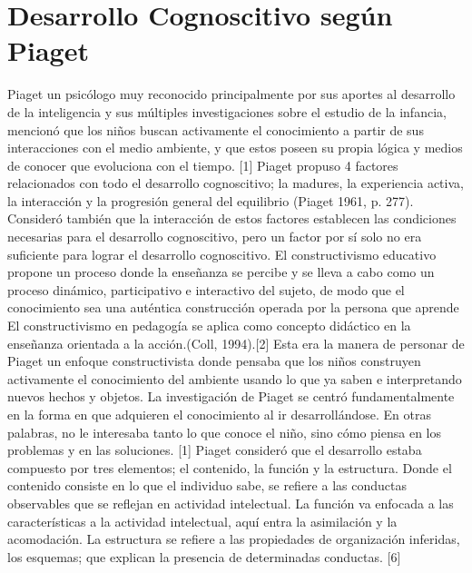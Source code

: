 \documentclass{bmcart}
\begin{document}
\section*{Desarrollo Cognoscitivo según Piaget}
Piaget un psicólogo muy reconocido principalmente por sus aportes al desarrollo de la inteligencia y sus múltiples investigaciones sobre el estudio de la infancia, mencionó que los niños buscan activamente el conocimiento a partir de sus interacciones con el medio ambiente,  y que estos poseen su propia lógica y medios de conocer que evoluciona con el tiempo. [1] 
\newline
\newline
Piaget propuso 4 factores relacionados con todo el desarrollo cognoscitivo; la madures, la experiencia activa, la interacción y la progresión general del equilibrio (Piaget 1961, p. 277). Consideró también que la interacción de estos factores establecen las condiciones necesarias para el desarrollo cognoscitivo, pero un factor por sí solo no era suficiente para lograr el desarrollo cognoscitivo.
\newline
\newline
El constructivismo educativo propone un proceso donde la enseñanza se percibe y se lleva a cabo como un proceso dinámico, participativo e interactivo del sujeto, de modo que el conocimiento sea una auténtica construcción operada por la persona que aprende El constructivismo en pedagogía se aplica como concepto didáctico en la enseñanza orientada a la acción.(Coll, 1994).[2]
\newline
\newline
Esta era la manera de personar de Piaget un enfoque constructivista donde pensaba que  los niños  construyen  activamente el  conocimiento  del  ambiente usando lo  que  ya  saben  e  interpretando  nuevos  hechos y  objetos.  La  investigación  de Piaget se  centró  fundamentalmente  en  la  forma  en  que  adquieren  el  conocimiento  al  ir desarrollándose. En otras palabras, no le interesaba tanto lo que conoce el niño, sino cómo piensa  en  los  problemas  y  en  las  soluciones. [1]
\newline
\newline
Piaget consideró que el desarrollo estaba compuesto por tres elementos; el contenido, la función y la estructura. Donde el contenido consiste en lo que el individuo sabe, se refiere a las conductas observables que se reflejan en actividad intelectual. La función va enfocada a las características a la actividad intelectual, aquí entra la asimilación y la acomodación. La estructura se refiere a las propiedades de organización inferidas, los esquemas; que explican la presencia de determinadas conductas. [6]
\end{document}
